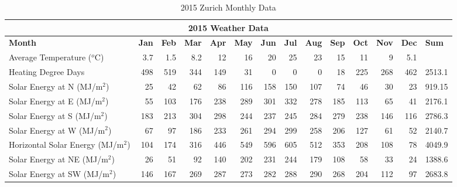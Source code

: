 \documentclass[a4paper, oneside]{discothesis}
\begin{document}
				\begin{table}[H]
				  \centering
				  \small
				\caption{2015 Zurich Monthly Data}
				    \begin{tabular}{|p{5.3em}|r|r|r|r|r|r|r|r|r|r|r|r|r|}
				    \toprule
				    \multicolumn{14}{|c|}{2015 Weather Data} \\
				    \midrule
				    \textbf{Month} & \multicolumn{1}{l|}{\textbf{Jan}} & \multicolumn{1}{l|}{\textbf{Feb}} & \multicolumn{1}{l|}{\textbf{Mar}} & \multicolumn{1}{l|}{\textbf{Apr}} & \multicolumn{1}{l|}{\textbf{May}} & \multicolumn{1}{l|}{\textbf{Jun}} & \multicolumn{1}{l|}{\textbf{Jul}} & \multicolumn{1}{l|}{\textbf{Aug}} & \multicolumn{1}{l|}{\textbf{Sep}} & \multicolumn{1}{l|}{\textbf{Oct}} & \multicolumn{1}{l|}{\textbf{Nov}} & \multicolumn{1}{l|}{\textbf{Dec}} & \multicolumn{1}{l|}{\textbf{Sum}} \\
				    \midrule
				    Average Temperature ($^o$C) & 3.7  & 1.5  & 8.2  & 12   & 16   & 20   & 25   & 23   & 15   & 11   & 9    & 5.1  &  \\
				    \midrule
				    Heating Degree Days & 498  & 519  & 344  & 149  & 31   & 0    & 0    & 0    & 18   & 225  & 268  & 462  & 2513.1 \\
				    \midrule
				    Solar Energy at N (MJ/m$^2$) & 25   & 42   & 62   & 86   & 116  & 158  & 150  & 107  & 74   & 46   & 30   & 23   & 919.15 \\
				    \midrule
				    Solar Energy at E (MJ/m$^2$) & 55   & 103  & 176  & 238  & 289  & 301  & 332  & 278  & 185  & 113  & 65   & 41   & 2176.1 \\
				    \midrule
				    Solar Energy at S (MJ/m$^2$) & 183  & 213  & 304  & 298  & 244  & 237  & 245  & 284  & 279  & 238  & 146  & 116  & 2786.3 \\
				    \midrule
				    Solar Energy at W (MJ/m$^2$) & 67   & 97   & 186  & 233  & 261  & 294  & 299  & 258  & 206  & 127  & 61   & 52   & 2140.7 \\
				    \midrule
				    Horizontal Solar Energy (MJ/m$^2$)& 104  & 174  & 316  & 446  & 549  & 596  & 605  & 512  & 353  & 208  & 108  & 78   & 4049.9 \\
				    \midrule
				    Solar Energy at NE (MJ/m$^2$)& 26   & 51   & 92   & 140  & 202  & 231  & 244  & 179  & 108  & 58   & 33   & 24   & 1388.6 \\
				    \midrule
				    Solar Energy at SW (MJ/m$^2$)& 146  & 167  & 269  & 287  & 273  & 282  & 288  & 290  & 268  & 204  & 112  & 97   & 2683.8 \\
				    \bottomrule
				    \end{tabular}%
				  \label{tab:2015Monthly}%
				\end{table}%
\end{document}
